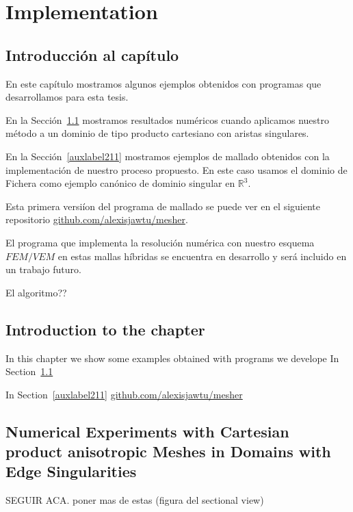 \chapter{Implementation}

\section*{Introducci\'on al cap\'itulo}
En este cap\'itulo mostramos algunos ejemplos obtenidos 
con programas que desarrollamos para esta tesis.

En la Sección~\ref{auxlabel210} mostramos resultados num\'ericos
cuando aplicamos nuestro m\'etodo a un dominio de tipo producto cartesiano
con aristas singulares. 

En la Sección~\ref{auxlabel211} mostramos ejemplos de mallado 
obtenidos con la implementaci\'on de nuestro proceso propuesto. 
En este caso usamos el dominio de Fichera como ejemplo can\'onico 
de dominio singular en $\mathbb{R}^3$.

Esta primera versi\'ion del programa de mallado se puede ver en el siguiente 
repositorio \href{https://github.com/alexisjawtu/mesher}{github.com/alexisjawtu/mesher}.

El programa que implementa la resoluci\'on num\'erica con nuestro esquema
$FEM/VEM$ en estas mallas h\'ibridas se encuentra en desarrollo y ser\'a
incluido en un trabajo futuro.



El algoritmo??

\section*{Introduction to the chapter}
In this chapter we show some examples obtained with programs we 
develope 
In Section~\ref{auxlabel210}












In Section~\ref{auxlabel211}
\href{https://github.com/alexisjawtu/mesher}{github.com/alexisjawtu/mesher}


\section{Numerical Experiments with Cartesian product anisotropic Meshes in Domains with Edge Singularities}
\label{auxlabel210}
\edgedomain
SEGUIR ACA. poner mas de estas (figura del sectional view)
\unifSection
\tableErrorsUniformCylinder
\tableErrorsAnisoCylinder
